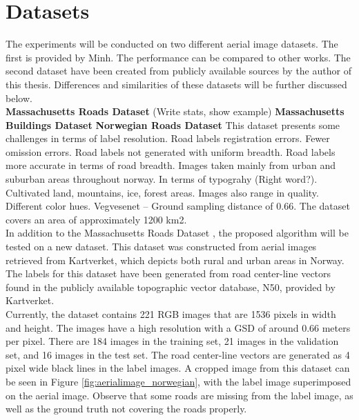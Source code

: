 \section{Datasets}
\label{sec:datasets}
The experiments will be conducted on two different aerial image datasets. The first is provided by Minh. The performance can be compared to other works. The second dataset have been created from publicly available sources by the author of this thesis. Differences and similarities of these datasets will be further discussed below. \\

\textbf{Massachusetts Roads Dataset}
(Write stats, show example)
\textbf{Massachusetts Buildings Dataset}
\textbf{Norwegian Roads Dataset}
This dataset presents some challenges in terms of label resolution. Road labels registration errors. Fewer omission errors.
Road labels not generated with uniform breadth. Road labels more accurate in terms of road breadth. Images taken mainly from urban and suburban areas throughout norway. In terms of typograhy (Right word?). Cultivated land, mountains, ice, forest areas. Images also range in quality. Different color hues. Vegvesenet --
Ground sampling distance of 0.66. 
The dataset covers an area of approximately 
1200 km2.\\

In addition to the Massachusetts Roads Dataset \citep{MnihThesis}, the proposed algorithm will be tested on a new dataset. This dataset was constructed from aerial images retrieved from Kartverket, which depicts both rural and urban areas in Norway. The labels for this dataset have been generated from road center-line vectors found in the publicly available topographic vector database, N50, provided by Kartverket. \\

Currently, the dataset contains 221 RGB images that are 1536 pixels in width and height. The images have a high resolution with a \ac{GSD} of around 0.66 meters per pixel. There are 184 images in the training set, 21 images in the validation set, and 16 images in the test set. The road center-line vectors are generated as 4 pixel wide black lines in the label images. A cropped image from this dataset can be seen in Figure \ref{fig:aerialimage_norwegian}, with the label image superimposed on the aerial image. Observe that some roads are missing from the label image, as well as the ground truth not covering the roads properly. \\

